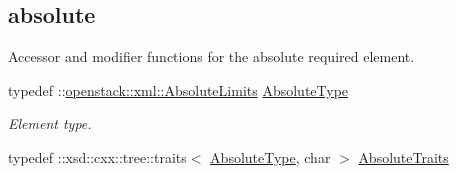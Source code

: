 \subsection*{absolute}
\label{_amgrpdc4d53aa0d117d8b189b36d161af4e96}
Accessor and modifier functions for the absolute required element. \begin{DoxyCompactItemize}
\item 
\hypertarget{classopenstack_1_1xml_1_1Limits_abc90b39e7e1b33a6686396294abf6b72}{
typedef ::\hyperlink{classopenstack_1_1xml_1_1AbsoluteLimits}{openstack::xml::AbsoluteLimits} \hyperlink{classopenstack_1_1xml_1_1Limits_abc90b39e7e1b33a6686396294abf6b72}{AbsoluteType}}
\label{classopenstack_1_1xml_1_1Limits_abc90b39e7e1b33a6686396294abf6b72}

\begin{DoxyCompactList}\small\item\em Element type. \item\end{DoxyCompactList}\item 
\hypertarget{classopenstack_1_1xml_1_1Limits_a5c62289a02102d7dce2c0c4905f958fb}{
typedef ::xsd::cxx::tree::traits$<$ \hyperlink{classopenstack_1_1xml_1_1AbsoluteLimits}{AbsoluteType}, char $>$ \hyperlink{classopenstack_1_1xml_1_1Limits_a5c62289a02102d7dce2c0c4905f958fb}{AbsoluteTraits}}
\label{classopenstack_1_1xml_1_1Limits_a5c62289a02102d7dce2c0c4905f958fb}


\end{DoxyCompactItemize}
